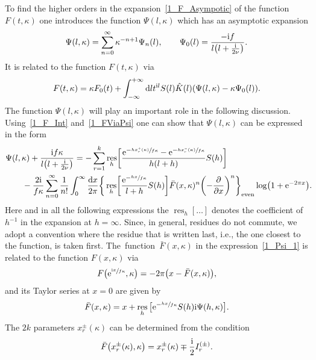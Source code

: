 \documentclass[pdftex]{sigma}
\numberwithin{equation}{section}
\DeclareMathOperator{\res}{res}
\begin{document}
To find the  higher orders in the expansion~\eqref{1_F_Asympotic} of the function $F(t, \kappa)$ one introduces the function $\Psi(l, \kappa)$ which has an asymptotic expansion
\begin{align*}%
\Psi(l, \kappa)=\sum_{n=0}^{\infty} \kappa^{-n+1} \Psi_n(l),
\qquad
\Psi_0(l)=\frac{-{\rm i}f}{l\bigl(l+\frac{{\rm i}}{2\nu}\bigr)}.
\end{align*}
It is related to the function $F(t, \kappa)$ via
\begin{align}\label{1_FViaPsi}
F(t, \kappa)=\kappa F_0(t)+\int_{-\infty}^{+\infty} {\rm d}l t^{{\rm i}l} S(l) \hat{K}(l)(\Psi(l, \kappa)-\kappa \Psi_0(l)).
\end{align}
The function $\Psi(l, \kappa)$ will play an important role in the following discussion. Using~\eqref{1_F_Int} and~\eqref{1_FViaPsi} one can show that $\Psi(l, \kappa)$ can be expressed in the form
\begin{align}
& \Psi(l, \kappa)+\frac{{\rm i}f\kappa}{l\bigl(l+\frac{{\rm i}}{2\nu}\bigr)}=
-\sum_{r=1}^{k} \res_h\biggl[\frac{{\rm e}^{-\sfrac{h x_r^+(\kappa)}{f\kappa}}-{\rm e}^{-\sfrac{h x_r^-(\kappa)}{f\kappa}}}{h(l+h)}S(h)\biggr] \nonumber\\
&\qquad{}-\frac{2{\rm i}}{f\kappa} \sum\limits_{n=0}^{\infty}\frac{1}{n!} \int_0^\infty \frac{{\rm d}x}{2\pi}
\bigg\{
\res_h\biggl[\frac{{\rm e}^{-\sfrac{hx}{f\kappa}}}{l+h}S(h)\biggr] \bar{F}(x, \kappa)^n \biggl(-\frac{\partial}{\partial x}\biggr)^n
\bigg\}_{{\rm even}}
\log\bigl(1+{\rm e}^{-2\pi x}\bigr).\!\!\!\label{1_Psi_1}
\end{align}
Here and in all the following expressions the $\res_h[\dots]$ denotes the coefficient of $h^{-1}$ in the expansion at $h=\infty$. Since, in general, residues do not commute, we adopt a convention where the residue that is written last, i.e., the one closest to the function, is taken first. The~function~$\bar{F}(x, \kappa)$ in the expression~\eqref{1_Psi_1} is related to the function $F(x, \kappa)$ via
\begin{align*}
F\bigl({\rm e}^{\sfrac{{\rm i}x}{f\kappa}}, \kappa\bigr)=-2\pi\bigl(x-\bar{F}(x, \kappa)\bigr),
\end{align*}
and its Taylor series at $x=0$ are given by
\begin{align}\label{1_FBar}
\bar{F}(x, \kappa)=x+\res_h \big[{\rm e}^{-\sfrac{hx}{f\kappa}} S(h) {\rm i} \Psi(h, \kappa)\big].
\end{align}
The $2k$ parameters $x_r^{\pm}(\kappa)$ can be determined from the condition
\begin{align}\label{1_BetheRoots_Final}
\bar{F}\bigl(x_r^{\pm}(\kappa), \kappa\bigr)=x_r^{\pm}(\kappa)\mp\frac{{\rm i}}{2}I_r^{(\pm)}.
\end{align}
\end{document}
